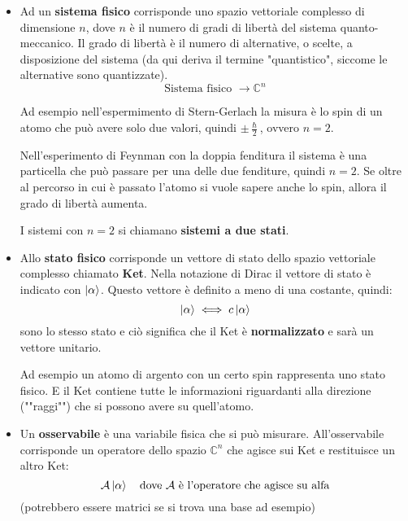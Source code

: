\documentclass[a4paper]{article}
\begin{document}
\begin{itemize}
  \item Ad un \textbf{sistema fisico} corrisponde uno spazio vettoriale complesso
    di dimensione \( n \), dove \( n \) è il numero di gradi di libertà del sistema
    quanto-meccanico. Il grado di libertà è il numero di alternative, o scelte, a
    disposizione del sistema (da qui deriva il termine "quantistico", siccome le
    alternative sono quantizzate).
    \[
    \text{Sistema fisico } \to \mathbb{C}^n
    \] 

    \vspace{1em}
    \noindent
    Ad esempio nell'espermimento di Stern-Gerlach la misura è lo spin di un atomo
    che può avere solo due valori, quindi \( \pm \frac{\hslash}{2} \), ovvero \( n = 2 \).

    Nell'esperimento di Feynman con la doppia fenditura il sistema è una particella
    che può passare per una delle due fenditure, quindi \( n = 2 \).
    Se oltre al percorso in cui è passato l'atomo si vuole sapere anche lo spin, allora
    il grado di libertà aumenta.

    \vspace{1em}
    \noindent
    I sistemi con \( n = 2 \) si chiamano \textbf{sistemi a due stati}.

  \item Allo \textbf{stato fisico} corrisponde un vettore di stato dello spazio 
    vettoriale complesso chiamato \textbf{Ket}. Nella notazione di Dirac il vettore di
    stato è indicato con \( \ket{\alpha} \). Questo vettore è definito a meno di una 
    costante, quindi:
    \[
      \ket{\alpha} \iff c \ket{\alpha}
    \] 
    sono lo stesso stato e ciò significa che il Ket è \textbf{normalizzato} e sarà un 
    vettore unitario.

    \vspace{1em}
    \noindent
    Ad esempio un atomo di argento con un certo spin rappresenta uno stato fisico. E
    il Ket contiene tutte le informazioni riguardanti alla direzione (""raggi"") che si possono 
    avere su quell'atomo.

  \item Un \textbf{osservabile} è una variabile fisica che si può misurare. All'osservabile
    corrisponde un operatore dello spazio \( \mathbb{C}^n \) che agisce sui Ket e
    restituisce un altro Ket:
    \[
      \mathcal{A} \ket{\alpha} \quad \text{dove } \mathcal{A} \text{ è l'operatore che
      agisce su alfa}
    \] 
    (potrebbero essere matrici se si trova una base ad esempio)


\end{itemize}
\end{document}

